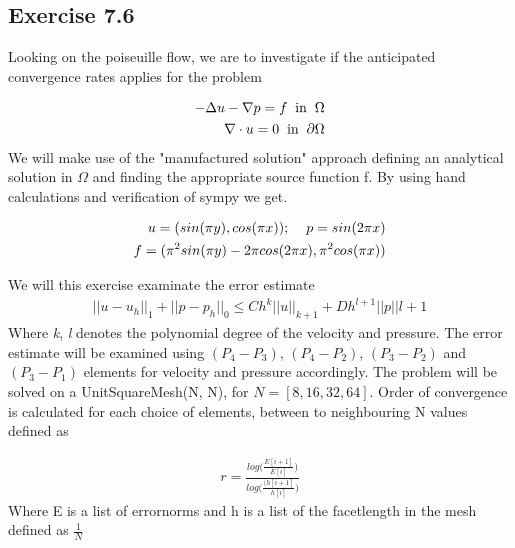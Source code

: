 \documentclass[a4paper,norsk]{article}
\begin{document}
\newpage
\subsection{Exercise 7.6}
Looking on the poiseuille flow, we are to investigate if the anticipated convergence rates applies for the problem

\begin{align*}
-\Delta u - \nabla p = f \hspace{2mm} \text{in} \hspace{2mm} \Omega \\
\nabla \cdot u = 0 \hspace{2mm} \text{in} \hspace{2mm} \partial\Omega \\
\end{align*}
We will make use of the "manufactured solution" approach defining an analytical solution in $\Omega$ and finding the appropriate
source function f. By using hand calculations and verification of sympy we get.

\begin{align*}
 u = (sin(\pi y), cos(\pi x)); \hspace{4mm} p = sin(2 \pi x) \\
 f = (\pi^2 sin(\pi y) - 2 \pi cos(2 \pi x), \pi^2 cos(\pi x))
\end{align*}

We will this exercise examinate the error estimate
\begin{align*}
 ||u - u_h||_1 + ||p - p_h||_0 \leq Ch^k||u||_{k+1} + Dh^{l+1} ||p||{l+1}
\end{align*}
Where \textit{k}, \textit{l} denotes the polynomial degree of the velocity and pressure. The error estimate will be
examined using $(P_4 - P_3)$, $(P_4 - P_2)$, $(P_3 - P_2)$ and $(P_3 - P_1)$ elements for velocity and pressure accordingly.
The problem will be solved on a UnitSquareMesh(N, N), for $N = [8, 16, 32, 64]$. Order of convergence is calculated for each choice
of elements, between to neighbouring N values defined as

\begin{align*}
 r  = \frac{log \big( \frac{E[i+1]}{E[i]} \big)} {log \big( \frac{(h[i+1]}{h[i]} \big)}
\end{align*}
Where E is a list of errornorms and h is a list of the facetlength in the mesh defined as $\frac{1}{N}$
\end{document}

